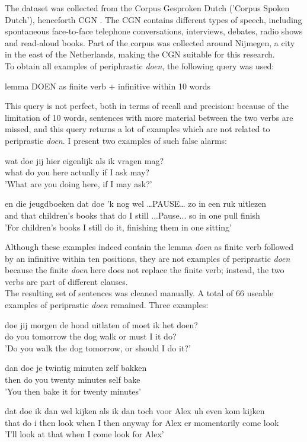 \documentclass[12pt]{article}
\begin{document}
The dataset was collected from the Corpus Gesproken Dutch ('Corpus Spoken Dutch'), henceforth CGN \citep{cgn}. The CGN contains different types of speech, including spontaneous face-to-face telephone conversations, interviews, debates, radio shows and read-aloud books. Part of the corpus was collected around Nijmegen, a city in the east of the Netherlands, making the CGN suitable for this research.\\\indent
To obtain all examples of periphrastic \emph{doen}, the following query was used:

\begin{exe}
\ex lemma DOEN as finite verb + infinitive within 10 words
\end{exe}

This query is not perfect, both in terms of recall and precision: because of the limitation of 10 words, sentences with more material between the two verbs are missed, and this query returns a lot of examples which are not related to periprastic \emph{doen}. I present two examples of such false alarms:

\begin{exe}
\ex \gll wat doe jij hier eigenlijk als ik vragen mag? \\
what do you here actually if I ask may?\\
\trans 'What are you doing here, if I may ask?'

\ex \gll en die jeugdboeken dat doe 'k {nog wel} …PAUSE… zo in een ruk uitlezen \\
and that {children's books} that do I still ...Pause... so in one pull finish\\
\trans 'For children's books I still do it, finishing them in one sitting'
\end{exe}

Although these examples indeed contain the lemma \emph{doen} as finite verb followed by an infinitive within ten positions, they are not examples of periprastic \emph{doen} because the finite \emph{doen} here does not replace the finite verb; instead, the two verbs are part of different clauses.\\\indent
The resulting set of sentences was cleaned manually. A total of 66 useable examples of periprastic \emph{doen} remained. Three examples:

\begin{exe} 
\ex \gll doe jij morgen de hond uitlaten of moet ik het doen? \\ 
do you tomorrow the dog walk or must I it do?\\ \label{hond}
\trans 'Do you walk the dog tomorrow, or should I do it?'

\ex \gll dan doe je twintig minuten zelf bakken \\
then do you twenty minutes self bake\\
\trans 'You then bake it for twenty minutes'

\ex \gll dat doe ik {dan wel} kijken als ik dan toch voor Alex uh even kom kijken \\
that do i then look when I then anyway for Alex er momentarily come look\\ \label{Alex}
\trans 'I'll look at that when I come look for Alex'
\end{exe}
\end{document}
